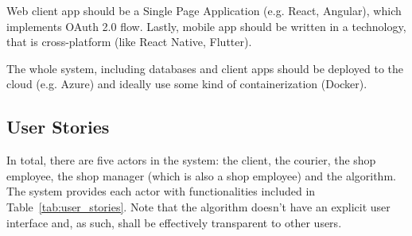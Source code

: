 \documentclass[../main.tex]{subfiles}
\begin{document}
Web client app should be a Single Page Application (e.g. React, Angular), which implements OAuth 2.0 flow. Lastly, mobile app should be written in a technology, that is cross-platform (like React Native, Flutter).

The whole system, including databases and client apps should be deployed to the cloud (e.g. Azure) and ideally use some kind of containerization (Docker).

\subsection{User Stories}

In total, there are five actors in the system: the client, the courier, the shop employee, the shop manager (which is also a shop employee) and the algorithm. The system provides each actor with functionalities included in Table~\ref{tab:user_stories}. Note that the algorithm doesn't have an explicit user interface and, as such, shall be effectively transparent to other users. 
\end{document}
